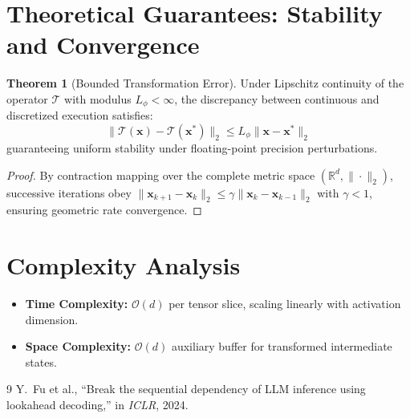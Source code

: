 \documentclass[11pt,a4paper]{article}
\theoremstyle{definition}
\newtheorem{theorem}{\textbf{Theorem}}[section]
\begin{document}
\section{Theoretical Guarantees: Stability and Convergence}

\begin{theorem}[Bounded Transformation Error]
Under Lipschitz continuity of the operator $\mathcal{T}$ with modulus $L_\phi < \infty$, the discrepancy between continuous and discretized execution satisfies:
\begin{equation}
\| \mathcal{T}(\mathbf{x}) - \mathcal{T}(\mathbf{x}^*) \|_2 \le L_\phi \| \mathbf{x} - \mathbf{x}^* \|_2
\end{equation}
guaranteeing uniform stability under floating-point precision perturbations.
\end{theorem}

\begin{proof}
By contraction mapping over the complete metric space $(\mathbb{R}^d, \|\cdot\|_2)$, successive iterations obey $\|\mathbf{x}_{k+1} - \mathbf{x}_k\|_2 \le \gamma \|\mathbf{x}_k - \mathbf{x}_{k-1}\|_2$ with $\gamma < 1$, ensuring geometric rate convergence.
\end{proof}

\section{Complexity Analysis}

\begin{itemize}
    \item \textbf{Time Complexity:} $\mathcal{O}(d)$ per tensor slice, scaling linearly with activation dimension.
    \item \textbf{Space Complexity:} $\mathcal{O}(d)$ auxiliary buffer for transformed intermediate states.
\end{itemize}

\begin{thebibliography}{9}
 Y.~Fu et al., ``Break the sequential dependency of LLM inference using lookahead decoding,'' in \emph{ICLR}, 2024.
\end{thebibliography}
\end{document}
